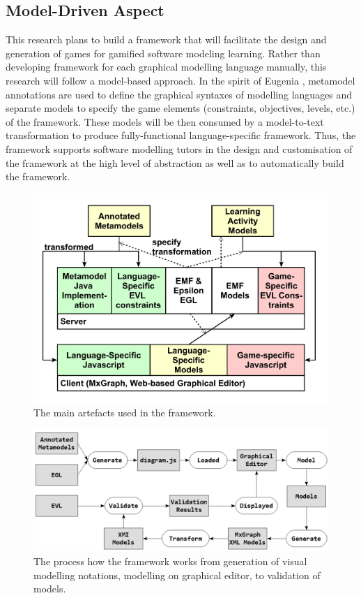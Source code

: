 \documentclass[12pt, a4paper]{report} \usepackage[titletoc]{appendix}
\begin{document}
\begin{appendices}
\section{Model-Driven Aspect}
This research plans to build a framework that will facilitate the design and generation of games for gamified software modeling learning. Rather than developing framework for each graphical modelling language manually, this research will follow a model-based approach. In the spirit of Eugenia \cite{kolovos2015eugenia}, metamodel annotations are used to define the graphical syntaxes of modelling languages and separate models to specify the game elements (constraints, objectives, levels, etc.) of the framework. These models will be then consumed by a model-to-text transformation to produce fully-functional language-specific framework. Thus, the framework supports software modelling tutors in the design and customisation of the framework at the high level of abstraction as well as to automatically build the framework. 

\begin{figure}[ht] \centering \includegraphics[width=12cm]{artefacts2}
\caption{The main artefacts used in the framework.}
\label{artefact}
\end{figure}

\begin{figure}[ht] \centering \includegraphics[width=12cm]{work-cycle}
\caption{The process how the framework works from generation of visual modelling notations, modelling on graphical editor, to validation of models.}
\label{work-cycle}
\end{figure}



\end{appendices}
\end{document}

